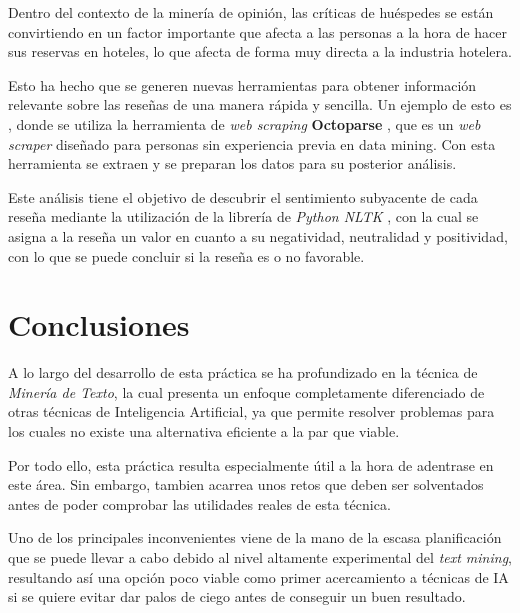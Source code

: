\documentclass[12pt,a4paper, xcolor=table]{article}
\begin{document}
\vspace{3mm}

Dentro del contexto de la minería de opinión, las críticas de huéspedes se están convirtiendo en un factor importante que afecta a las personas a la hora de hacer sus reservas en hoteles, lo que afecta de forma muy directa a la industria hotelera.

\vspace{2mm}

Esto ha hecho que se generen nuevas herramientas para obtener información relevante sobre las reseñas de una manera rápida y sencilla. Un ejemplo de esto es \cite{sentiment}, donde se utiliza la herramienta de \textit{web scraping} \textbf{Octoparse} \cite{octoparse}, que es un \textit{web scraper} diseñado para personas sin experiencia previa en data mining. Con esta herramienta se extraen y se preparan los datos para su posterior análisis.

\vspace{2mm}

Este análisis tiene el objetivo de descubrir el sentimiento subyacente de cada reseña mediante la utilización de la librería de \textit{Python NLTK} \cite{nltk}, con la cual se asigna a la reseña un valor en cuanto a su negatividad, neutralidad y positividad, con lo que se puede concluir si la reseña es o no favorable.



\section{Conclusiones}
A lo largo del desarrollo de esta práctica se ha profundizado en la técnica de \textit{Minería de Texto}, la cual presenta un enfoque completamente diferenciado de otras técnicas de Inteligencia Artificial, ya que permite resolver problemas para los cuales no existe una alternativa eficiente a la par que viable.

\vspace{3mm}

Por todo ello, esta práctica resulta especialmente útil a la hora de adentrase en este área. Sin embargo, tambien acarrea unos retos que deben ser solventados antes de poder comprobar las utilidades reales de esta técnica.

\vspace{2mm}

Uno de los principales inconvenientes viene de la mano de la escasa planificación que se puede llevar a cabo debido al nivel altamente experimental del \textit{text mining}, resultando así una opción poco viable como primer acercamiento a técnicas de IA si se quiere evitar dar palos de ciego antes de conseguir un buen resultado.
\end{document}
